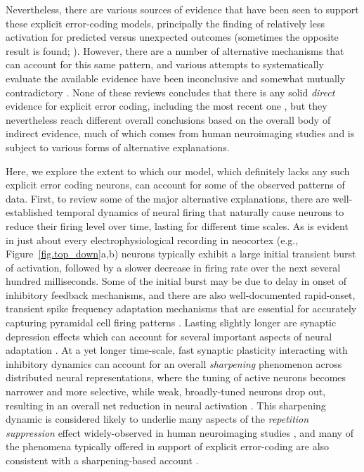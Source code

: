 \documentclass[11pt,twoside]{article}
\newif\myifpdf
\begin{document}
Nevertheless, there are various sources of evidence that have been seen to support these explicit error-coding models, principally the finding of relatively less activation for predicted versus unexpected outcomes \cite[e.g.,]{SummerfieldTrittschuhMontiEtAl08,TodorovicEdeMarisEtAl11,MeyerOlson11,BastosUsreyAdamsEtAl12} (sometimes the opposite result is found; ).  However, there are a number of alternative mechanisms that can account for this same pattern, and various attempts to systematically evaluate the available evidence have been inconclusive and somewhat mutually contradictory \cite{KokLange15,KokJeheedeLange12,SummerfieldEgner09,LeeMumford03}.  None of these reviews concludes that there is any solid {\em direct} evidence for explicit error coding, including the most recent one \cite{KokLange15}, but they nevertheless reach different overall conclusions based on the overall body of indirect evidence, much of which comes from human neuroimaging studies and is subject to various forms of alternative explanations.

Here, we explore the extent to which our model, which definitely lacks any such explicit error coding neurons, can account for some of the observed patterns of data.  First, to review some of the major alternative explanations, there are well-established temporal dynamics of neural firing that naturally cause neurons to reduce their firing level over time, lasting for different time scales.  As is evident in just about every electrophysiological recording in neocortex (e.g., Figure~\ref{fig.top_down}a,b) neurons typically exhibit a large initial transient burst of activation, followed by a slower decrease in firing rate over the next several hundred milliseconds.  Some of the initial burst may be due to delay in onset of inhibitory feedback mechanisms, and there are also well-documented rapid-onset, transient spike frequency adaptation mechanisms that are essential for accurately capturing pyramidal cell firing patterns \cite{BretteGerstner05,GerstnerNaud09}.  Lasting slightly longer are synaptic depression effects \cite{MarkramTsodyks96,AbbottVarelaSenEtAl97,Hennig13} which can account for several important aspects of neural adaptation \cite{MullerMethaKrauskopfEtAl99}.  At a yet longer time-scale, fast synaptic plasticity interacting with inhibitory dynamics can account for an overall {\em sharpening} phenomenon across distributed neural representations, where the tuning of active neurons becomes narrower and more selective, while weak, broadly-tuned neurons drop out, resulting in an overall net reduction in neural activation \cite{Desimone96,WiggsMartin98,NormanOReilly03}.  This sharpening dynamic is considered likely to underlie many aspects of the {\em repetition suppression} effect widely-observed in human neuroimaging studies \cite{Grill-SpectorHensonMartin06}, and many of the phenomena typically offered in support of explicit error-coding are also consistent with a sharpening-based account \cite{KokJeheedeLange12,LeeMumford03}.
\end{document}
